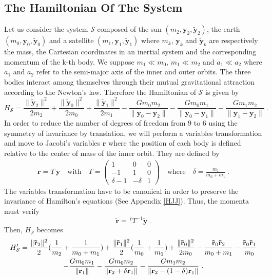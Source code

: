 \documentclass[a4paper]{article}
\begin{document}
\subsection{The Hamiltonian Of The System}
Let us consider the system $\mathcal S$ composed of the sun $(m_{2},\mathbf y_{2},\mathbf {\tilde y}_{2})$, the earth $(m_{0},\mathbf y_{0},\mathbf {\tilde y}_{0})$ and a satellite $(m_{1},\mathbf y_{1},\mathbf {\tilde y}_{1})$ where $m_{k}$, $\mathbf y_{k}$ and $\mathbf {\tilde y}_{k}$ are respectively the mass, the Cartesian coordinates in an inertial system and the corresponding momentum of the k-th body. 
We suppose $m_{1}\ll m_{0}$, $m_{1}\ll m_{2}$ and $a_{1}\ll a_{2}$ where $a_{1}$ and $a_{2}$ refer to the semi-major axis of the inner and outer orbits.
The three bodies interact among themselves through their mutual gravitational attraction according to the Newton's law. Therefore the Hamiltonian of $\mathcal S$ is given by
\begin{equation}
\label{Hamiltonian}
H_{\mathcal S}=\frac{\| \mathbf {\tilde y}_{2} \|^{2}}{2m_{2}}+\frac{\| \mathbf {\tilde y}_{0} \|^{2}}{2m_{0}}+\frac{\| \mathbf {\tilde y}_{1} \|^{2}}{2m_{1}}-\frac{Gm_{0}m_{2}}{\|\mathbf y_{0}- \mathbf y_{2}\|}-\frac{Gm_{0}m_{1}}{\|\mathbf y_{0}- \mathbf y_{1}\|}-\frac{Gm_{1}m_{2}}{\|\mathbf y_{1}- \mathbf y_{2}\|} \ .
\end{equation}
In order to reduce the number of degrees of freedom from 9 to 6 using the symmetry of invariance by translation, we will perform a variables transformation and move to Jacobi's variables $\mathbf r$ where the position of each body is defined relative to the center of mass of the inner orbit. 
They are defined by 
\begin{align}
\mathbf r = T \, \mathbf y \quad \text{with} \quad 
T=
\begin{pmatrix}
1 & 0 & 0 \\
-1 & 1 & 0 \\
\delta-1 & -\delta & 1
\end{pmatrix}
\quad
\text{where}
\quad
\delta=\frac{m_{1}}{m_{0}+m_{1}} \ .
\end{align}
The variables transformation have to be canonical in order to preserve the invariance of Hamilton's equations (See Appendix \ref{HJJ}).
Thus, the momenta must verify
\begin{equation}
\mathbf {\tilde r}= \, ^tT^{-1} \mathbf {\tilde y} \ .
\end{equation}
Then, $H_\mathcal S$ becomes
\begin{gather}
H_\mathcal S'=\frac{\| \mathbf {\tilde r}_{2} \|^{2}}{2}(\frac{1}{m_{2}}+\frac{1}{m_{0}+m_{1}})+\frac{\| \mathbf {\tilde r}_{1} \|^{2}}{2}(\frac{1}{m_{0}}+\frac{1}{m_{1}})+\frac{\| \mathbf {\tilde r}_{0} \|^{2}}{2m_{0}}-\frac{\mathbf {\tilde r}_{0}\mathbf {\tilde r}_{2}}{m_{0}+m_{1}}-\frac{\mathbf {\tilde r}_{0}\mathbf {\tilde r}_{1}}{m_{0}} \notag \\
-\frac{Gm_{0}m_{1}}{\|\mathbf r_{1}\|}-\frac{Gm_{0}m_{2}}{\|\mathbf r_{2} + \delta \mathbf r_{1}\|}-\frac{Gm_{1}m_{2}}{\|\mathbf r_{2}- (1-\delta)\mathbf r_{1}\|} \ .
\label{Hi'}
\end{gather}
\end{document}
